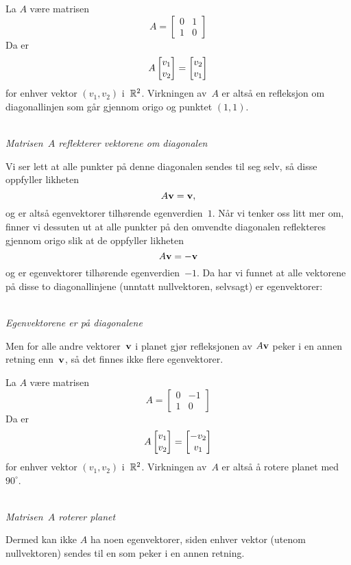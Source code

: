 \begin{ex}
La $A$ være matrisen
\[
A =
\begin{bmatrix}
0 & 1 \\
1 & 0
\end{bmatrix}
\]
Da er
\[
A \begin{bmatrix} v_1 \\ v_2 \end{bmatrix} = \begin{bmatrix} v_2 \\ v_1 \end{bmatrix}
\]
for enhver vektor $(v_1, v_2)$ i~$\mathbb{R}^2$.  Virkningen av~$A$ er altså
en refleksjon om diagonallinjen som går gjennom origo og punktet
$(1,1)$.
\begin{center}
\\
{\small \textit{Matrisen~$A$ reflekterer vektorene om diagonalen}}
\end{center}
Vi ser lett at alle punkter på denne diagonalen sendes til seg selv,
så disse oppfyller likheten
\[
A \mathbf{v} = \mathbf{v},
\]
og er altså egenvektorer tilhørende egenverdien~$1$.  Når vi tenker
oss litt mer om, finner vi dessuten ut at alle punkter på den omvendte
diagonalen reflekteres gjennom origo slik at de oppfyller likheten
\[
A \mathbf{v} = - \mathbf{v}
\]
og er egenvektorer tilhørende egenverdien~$-1$.  Da har vi funnet at
alle vektorene på disse to diagonallinjene (unntatt nullvektoren,
selvsagt) er egenvektorer:
\begin{center}
\\
{\small \textit{Egenvektorene er på diagonalene}}
\end{center}
Men for alle andre vektorer~$\mathbf{v}$ i planet gjør refleksjonen av
$A \mathbf{v}$ peker i en annen retning enn~$\mathbf{v}$, så det finnes ikke
flere egenvektorer.
\end{ex}

\begin{ex}
La $A$ være matrisen
\[
A =
\begin{bmatrix}
0 & -1 \\
1 &  0
\end{bmatrix}
\]
Da er
\[
A \begin{bmatrix} v_1 \\ v_2 \end{bmatrix} = \begin{bmatrix} -v_2 \\ v_1 \end{bmatrix}
\]
for enhver vektor $(v_1, v_2)$ i~$\mathbb{R}^2$.  Virkningen av~$A$ er altså
å rotere planet med~$90^{\circ}$.
\begin{center}
\\
{\small \textit{Matrisen~$A$ roterer planet}}
\end{center}
Dermed kan ikke $A$ ha noen egenvektorer, siden enhver vektor (utenom
nullvektoren) sendes til en som peker i en annen retning.
\end{ex}



